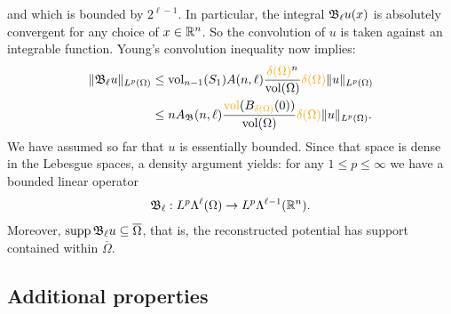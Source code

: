 \documentclass[10pt,letterpaper]{article}
\newcommand\cye[1]{%
  \protect\leavevmode
  \begingroup
    \color{red!35!yellow}%
    #1%
  \endgroup
}
\begin{document}
and which is bounded by $2^{\ell-1}$. 
In particular, the integral ${\mathfrak B}_{\ell} u(x)$ is absolutely convergent for any choice of $x \in {\mathbb R}^{n}$. 
So the convolution of $u$ is taken against an integrable function. 
Young's convolution inequality now implies: 
\begin{align*}
    \| \Bogov_{\ell} u \|_{L^{p}(\Omega)}
    &
    \leq 
    \vol_{n-1}(S_1) A(n,\ell) \frac{ \cye{\diam(\Omega)}^{n} }{\vol(\Omega)} 
    \cye{\diam(\Omega)}
    \| u \|_{L^{p}(\Omega)}
    \\&
    \leq 
    n A_{\Bogov}(n,\ell) \frac{ \cye{\vol}(B_{\cye{\diam(\Omega)}}(0)) }{\vol(\Omega)} 
    \cye{\diam(\Omega)}
    \| u \|_{L^{p}(\Omega)}
    .
\end{align*}
We have assumed so far that $u$ is essentially bounded.
Since that space is dense in the Lebesgue spaces, a density argument yields: 
for any $1 \leq p \leq \infty$ we have a bounded linear operator 
\begin{gather*}
    {\mathfrak B}_{\ell} : L^{p}\Lambda^{\ell}(\Omega) \rightarrow L^{p}\Lambda^{\ell-1}({\mathbb R}^n).
\end{gather*}
Moreover, $\operatorname{supp} {\mathfrak B}_{\ell} u \subseteq \overline\Omega$,
that is, the reconstructed potential has support contained within $\overline\Omega$. 

\subsection{\cye{Additional properties}}
\end{document}
